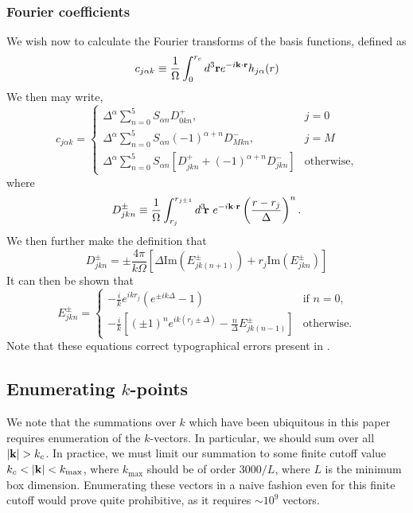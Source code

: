 \documentclass{article}
\begin{document}
\subsubsection{Fourier coefficients}
We wish now to calculate the Fourier transforms of the basis
functions, defined as
\begin{equation}
c_{j\alpha k} \equiv \frac{1}{\Omega} \int_0^{r_c} d^3 \mathbf{r} 
e^{-i \mathbf{k} \cdot \mathbf{r}} h_{j\alpha}(r)
\end{equation}
We then may write,
\begin{equation}
c_{j\alpha k} = 
\begin{cases}
\Delta^\alpha \sum_{n=0}^5 S_{\alpha n} D^+_{0 k n}, & j = 0 \\
\Delta^\alpha \sum_{n=0}^5 S_{\alpha n} (-1)^{\alpha+n} D^-_{M k n}, &
j = M \\
\Delta^\alpha \sum_{n=0}^5 S_{\alpha n} 
\left[ D^+_{j k n} + (-1)^{\alpha+n}D^-_{j k n} \right] & \text{otherwise},
\end{cases}
\end{equation}
where
\begin{equation}
D^{\pm}_{jkn} \equiv \frac{1}{\Omega} \int_{r_j}^{r_{j\pm1}} d^3\!\vr \ 
e^{-i\vk \cdot \vr} \left( \frac{r-r_j}{\Delta}\right)^n.
\end{equation}
We then further make the definition that
\renewcommand{\Im}{\text{Im}}
\begin{equation}
D^{\pm}_{jkn} = \pm \frac{4\pi}{k \Omega} 
\left[ \Delta \Im \left(E^{\pm}_{jk(n+1)}\right) + 
r_j \Im \left(E^{\pm}_{jkn}\right)\right]
\end{equation}
It can then be shown that 
\begin{equation}
E^{\pm}_{jkn} =
\begin{cases}
-\frac{i}{k} e^{ikr_j} \left( e^{\pm i k \Delta} - 1 \right) &
\text{if } n=0, \\
-\frac{i}{k} 
\left[ \left(\pm1\right)^n e^{i k (r_j \pm \Delta)} - \frac{n}{\Delta}
E^\pm_{jk(n-1)}  \right] & \text{otherwise}.
\end{cases}
\end{equation}
Note that these equations correct typographical errors present in \cite{Natoli}.
\subsection{Enumerating $k$-points}
We note that the summations over $k$ which have been ubiquitous in
this paper requires enumeration of the $k$-vectors.  In particular, we
should sum over all $|\mathbf{k}| > k_c$.  In practice, we must limit our
summation to some finite cutoff value $k_c < |\mathbf{k}| < k_\text{max}$,
where $k_\text{max}$ should be of order $3000/L$, where $L$ is the
minimum box dimension.  Enumerating these vectors in a naive fashion
even for this finite cutoff would prove quite prohibitive, as it
requires $\sim 10^9$ vectors.
\end{document}
